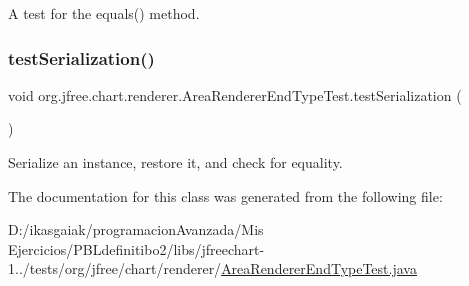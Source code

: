 A test for the equals() method. \mbox{\label{classorg_1_1jfree_1_1chart_1_1renderer_1_1_area_renderer_end_type_test_abdf5bbe21e6b121e00752c69b0065e21}} 
\subsubsection{\texorpdfstring{test\+Serialization()}{testSerialization()}}
{\footnotesize\ttfamily void org.\+jfree.\+chart.\+renderer.\+Area\+Renderer\+End\+Type\+Test.\+test\+Serialization (\begin{DoxyParamCaption}{ }\end{DoxyParamCaption})}

Serialize an instance, restore it, and check for equality. 

The documentation for this class was generated from the following file\+:\begin{DoxyCompactItemize}
\item 
D\+:/ikasgaiak/programacion\+Avanzada/\+Mis Ejercicios/\+P\+B\+Ldefinitibo2/libs/jfreechart-\/1../tests/org/jfree/chart/renderer/\mbox{\hyperlink{_area_renderer_end_type_test_8java}{Area\+Renderer\+End\+Type\+Test.\+java}}\end{DoxyCompactItemize}
